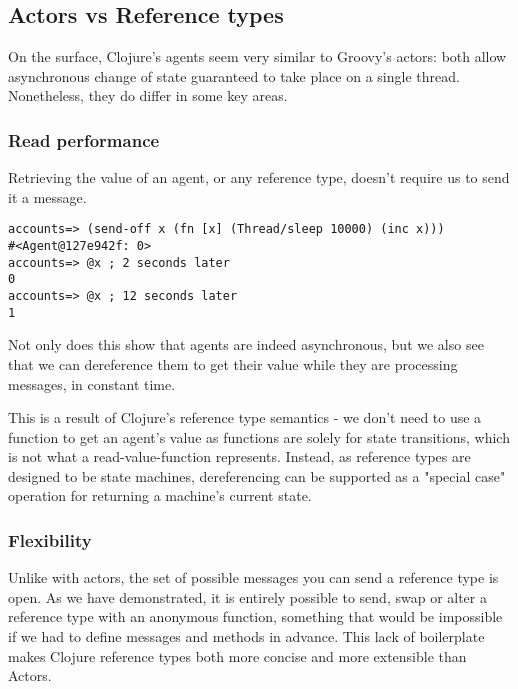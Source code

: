 \documentclass[a4paper,12pt]{kth-mag}
\begin{document}
\subsection{Actors vs Reference types}

On the surface, Clojure's agents seem very similar to Groovy's actors: both allow asynchronous change of state guaranteed to take place on a single thread. Nonetheless, they do differ in some key areas.

\subsubsection{Read performance}

Retrieving the value of an agent, or any reference type, doesn't require us to send it a message. 

\begin{listing}[H]
	\begin{verbatim}
accounts=> (send-off x (fn [x] (Thread/sleep 10000) (inc x)))
#<Agent@127e942f: 0>
accounts=> @x ; 2 seconds later
0
accounts=> @x ; 12 seconds later
1
	\end{verbatim}
\end{listing}

Not only does this show that agents are indeed asynchronous, but we also see that we can dereference them to get their value while they are processing messages, in constant time.

This is a result of Clojure's reference type semantics - we don't need to use a function to get an agent's value as functions are solely for state transitions, which is not what a read-value-function represents. Instead, as reference types are designed to be state machines, dereferencing can be supported as a "special case" operation for returning a machine's current state.

\subsubsection{Flexibility}

Unlike with actors, the set of possible messages you can send a reference type is open. As we have demonstrated, it is entirely possible to send, swap or alter a reference type with an anonymous function, something that would be impossible if we had to define messages and methods in advance. This lack of boilerplate makes Clojure reference types both more concise and more extensible than Actors.
\end{document}
